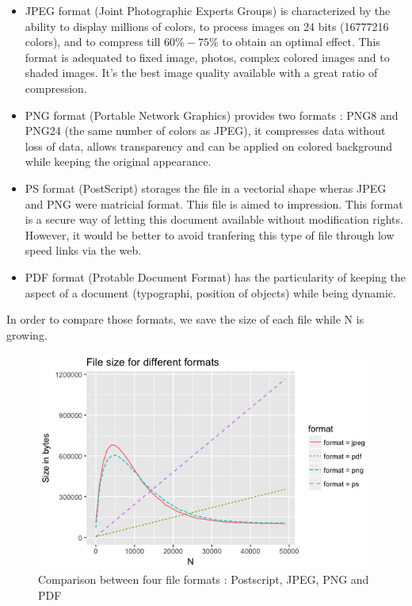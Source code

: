 \documentclass{article}
\begin{document}
\begin{itemize}
  \item JPEG format (Joint Photographic Experts Groups) is characterized by the ability to display millions of colors, to process images on 24 bits (16777216 colors), and to compress till $60\% - 75\%$ to obtain an optimal effect. This format is  adequated to fixed image, photos, complex colored images and to shaded images. It's the best image quality available with a great ratio of compression.
  \item PNG format (Portable Network Graphics) provides two formats : PNG8 and PNG24 (the same number of colors as JPEG), it compresses data without loss of data, allows transparency and can be applied on colored background while keeping the original appearance.
  \item PS format (PostScript) storages the file in a vectorial shape wheras JPEG and PNG were matricial format. This file is aimed to impression. This format is a secure way of letting this document available without modification rights. However, it would be better to avoid tranfering this type of file through low speed links via the web.
  \item PDF format (Protable Document Format) has the particularity of keeping the aspect of a document (typographi, position of objects) while being dynamic.
\end{itemize}
In order to compare those formats, we save the size of each file while N is growing.

\begin{figure}[!ht]
\centering
\includegraphics[width=.8\textwidth]{size_file.png}
 \caption{Comparison between four file formats : Postscript, JPEG, PNG and PDF}
\label{size_file}
\end{figure}
\end{document}
